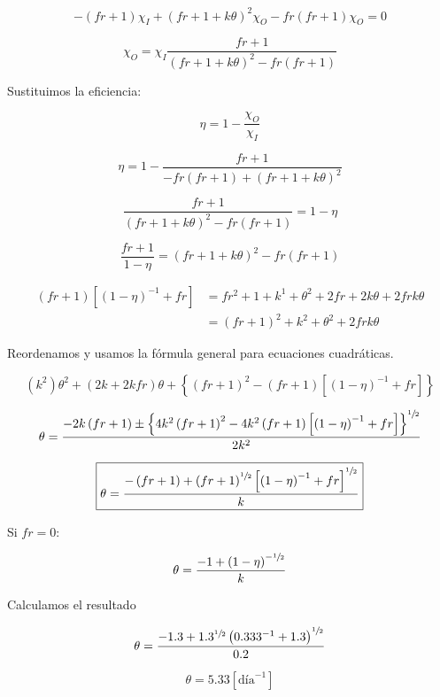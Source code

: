\documentclass[11pt]{article}
\begin{document}
\[ - \left( fr + 1 \right) \chi_I + \left( fr + 1 + k \theta \right) ^ 2 \chi_O - fr \left( fr + 1 \right) \chi_O = 0 \]

\[ \chi_{ O } = \chi_I \frac{ fr + 1 }{ \left( fr + 1 + k \theta \right) ^ 2 - fr \left( fr + 1 \right) } \]

Sustituimos la eficiencia:

\[ \eta = 1 - \frac{ \chi_O }{ \chi_I } \]

\[ \eta = 1 - \frac{ fr + 1 }{ - fr \left( fr + 1 \right) + \left( fr + 1 + k \theta \right) ^ 2 } \]

\[ \frac{ fr + 1 }{ \left( fr + 1 + k \theta \right) ^ 2 - fr \left( fr + 1 \right) } = 1 - \eta \]

\[ \frac{ fr + 1 }{ 1 - \eta } = \left( fr + 1 + k \theta \right) ^ 2 - fr \left( fr + 1 \right) \]

\[ \begin{aligned}
    \left( fr + 1 \right) \left[ \left( 1 - \eta \right) ^ {-1} + fr \right] & = fr ^ 2 + 1 + k ^ 1 + \theta ^ 2 + 2 fr + 2 k \theta + 2 fr k \theta \\
    & = \left( fr + 1 \right) ^ 2 + k ^ 2 + \theta ^ 2 + 2 fr k \theta
\end{aligned} \]

Reordenamos y usamos la fórmula general para ecuaciones cuadráticas.

\[ \left( k ^ 2 \right) \theta ^ 2 + \left( 2 k + 2 k fr \right) \theta + \left\{ \left( fr + 1 \right) ^ 2 - \left( fr + 1 \right) \left[ \left( 1 - \eta \right) ^ {-1} + fr \right] \right\} \]

\[ \theta = \frac{ - 2 k \left( fr + 1 \right) \pm \left\{ 4 k ^ 2 \left( fr + 1 \right) ^ 2 - 4 k ^ 2 \left( fr + 1 \right) \left[ \left( 1 - \eta \right) ^ {-1} + fr \right] \right\} ^ { \sfrac{1}{2} } }{ 2 k ^ 2 } \]

\[ \boxed{ \theta = \frac{ - \left( fr + 1 \right) + \left( fr + 1 \right) ^ { \sfrac{1}{2} } \left[ \left( 1 - \eta \right) ^ {-1} + fr \right] ^ { \sfrac{1}{2} } }{ k } } \]

Si \( fr = 0 \):

\[ \theta = \frac{ - 1 + \left( 1 - \eta \right) ^ { - \sfrac{1}{2} } }{ k } \]

Calculamos el resultado

\[ \theta = \frac{ -1.3 + 1.3 ^ { \sfrac{1}{2} } \left( 0.333 ^ {-1} + 1.3 \right) ^ { \sfrac{1}{2} } }{ 0.2 } \]

\[ \boxed{ \theta = 5.33 \left[ \text{día} ^ {-1} \right] } \]
\end{document}
